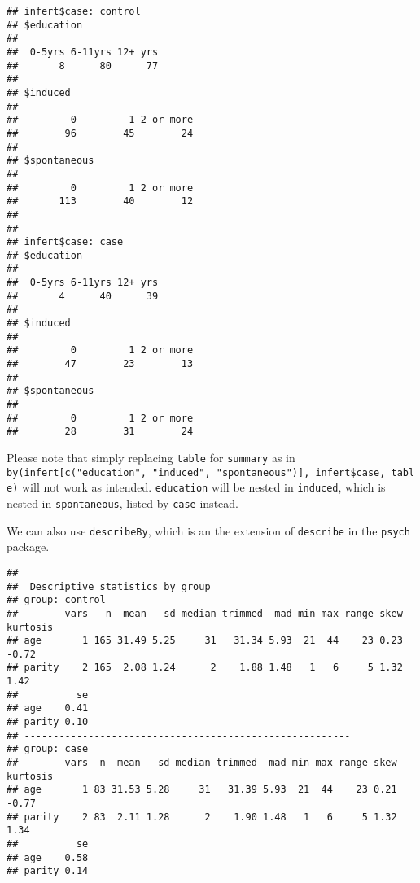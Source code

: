 \documentclass[]{book}
\newenvironment{Shaded}{\begin{snugshade}}{\end{snugshade}}
\newcommand{\KeywordTok}[1]{\textcolor[rgb]{0.13,0.29,0.53}{\textbf{#1}}}
\newcommand{\DataTypeTok}[1]{\textcolor[rgb]{0.13,0.29,0.53}{#1}}
\newcommand{\StringTok}[1]{\textcolor[rgb]{0.31,0.60,0.02}{#1}}
\newcommand{\OperatorTok}[1]{\textcolor[rgb]{0.81,0.36,0.00}{\textbf{#1}}}
\newcommand{\NormalTok}[1]{#1}
\theoremstyle{definition}
\theoremstyle{definition}
\theoremstyle{remark}
\begin{document}
\begin{verbatim}
## infert$case: control
## $education
## 
##  0-5yrs 6-11yrs 12+ yrs 
##       8      80      77 
## 
## $induced
## 
##         0         1 2 or more 
##        96        45        24 
## 
## $spontaneous
## 
##         0         1 2 or more 
##       113        40        12 
## 
## -------------------------------------------------------- 
## infert$case: case
## $education
## 
##  0-5yrs 6-11yrs 12+ yrs 
##       4      40      39 
## 
## $induced
## 
##         0         1 2 or more 
##        47        23        13 
## 
## $spontaneous
## 
##         0         1 2 or more 
##        28        31        24
\end{verbatim}

Please note that simply replacing \texttt{table} for \texttt{summary} as
in
\texttt{by(infert{[}c("education",\ "induced",\ "spontaneous"){]},\ infert\$case,\ table)}
will not work as intended. \texttt{education} will be nested in
\texttt{induced}, which is nested in \texttt{spontaneous}, listed by
\texttt{case} instead.

We can also use \texttt{describeBy}, which is an the extension of
\texttt{describe} in the \texttt{psych} package.

\begin{Shaded}
\end{Shaded}

\begin{verbatim}
## 
##  Descriptive statistics by group 
## group: control
##        vars   n  mean   sd median trimmed  mad min max range skew kurtosis
## age       1 165 31.49 5.25     31   31.34 5.93  21  44    23 0.23    -0.72
## parity    2 165  2.08 1.24      2    1.88 1.48   1   6     5 1.32     1.42
##          se
## age    0.41
## parity 0.10
## -------------------------------------------------------- 
## group: case
##        vars  n  mean   sd median trimmed  mad min max range skew kurtosis
## age       1 83 31.53 5.28     31   31.39 5.93  21  44    23 0.21    -0.77
## parity    2 83  2.11 1.28      2    1.90 1.48   1   6     5 1.32     1.34
##          se
## age    0.58
## parity 0.14
\end{verbatim}
\end{document}

